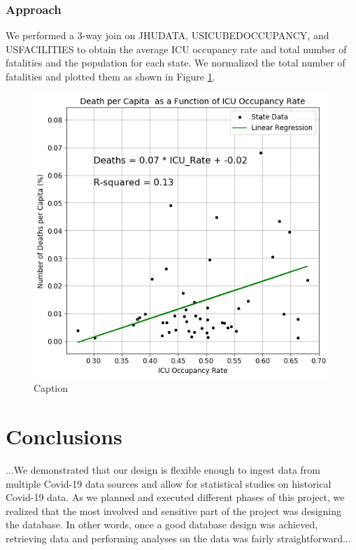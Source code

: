\documentclass[11pt]{article}
\begin{document}
\subsubsection{Approach}
We performed a 3-way join on JHUDATA, USICUBEDOCCUPANCY, and USFACILITIES to obtain the average ICU occupancy rate and total number of fatalities and the population for each state. We normalized the total number of fatalities and plotted them as shown in Figure \ref{fig:death_pop_icu}.
\begin{figure}[h]
    \centering
    \includegraphics[scale=0.5]{diagrams/analysis/death_icu.png}
    \caption{Caption}
    \label{fig:death_pop_icu}
\end{figure}


\pagebreak

\section{Conclusions}
...We demonstrated that our design is flexible enough to ingest data from multiple Covid-19 data sources and allow for statistical studies on historical Covid-19 data. As we planned and executed different phases of this project, we realized that the most involved and sensitive part of the project was designing the database. In other words, once a good database design was achieved, retrieving data and performing analyses on the data was fairly straightforward...
\end{document}
